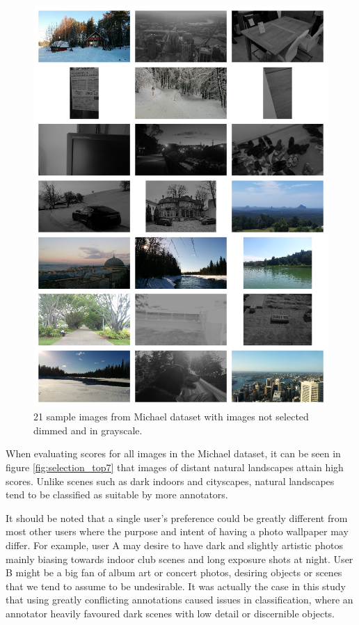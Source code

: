 \begin{figure}
\centering\includegraphics[width=0.9\columnwidth]{../figures/grid7x3_out2.png}
\caption{21 sample images from Michael dataset with images not selected dimmed
	and in grayscale.\label{fig:selection_out2}}
\end{figure}

When evaluating scores for all images in the Michael dataset, it can be seen in
figure \ref{fig:selection_top7} that images of distant natural landscapes attain
high scores.
Unlike scenes such as dark indoors and cityscapes, natural landscapes tend to be
classified as suitable by more annotators.

It should be noted that a single user's preference could be greatly different
from most other users where the purpose and intent of having a photo wallpaper
may differ.
For example, user A may desire to have dark and slightly artistic photos mainly
biasing towards indoor club scenes and long exposure shots at night.
User B might be a big fan of album art or concert photos, desiring objects or
scenes that we tend to assume to be undesirable.
It was actually the case in this study that using greatly conflicting
annotations caused issues in classification, where an annotator heavily favoured
dark scenes with low detail or discernible objects.

